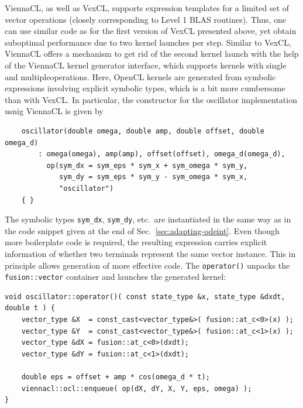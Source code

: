 \documentclass[final]{siamltex}
\newcommand{\code}[1]{\lstinline|#1|}
\begin{document}
ViennaCL, as well as VexCL, supports expression templates for a limited set of    %
vector operations (closely corresponding to Level 1 BLAS routines).
Thus, one can use similar code as for the first version of VexCL presented above,
yet obtain suboptimal performance due to two kernel launches per step.
Similar to VexCL, ViennaCL offers a mechanism to get rid of the second kernel launch
with the help of the ViennaCL kernel generator interface, which supports kernels with single and multipleoperations.
Here, OpenCL kernels are generated from symbolic expressions involving explicit symbolic types,
which is a bit more cumbersome than with VexCL. In particular, the constructor
for the oscillator implementation usnig ViennaCL is given by
%
%
%
\begin{lstlisting}
    oscillator(double omega, double amp, double offset, double omega_d)
        : omega(omega), amp(amp), offset(offset), omega_d(omega_d),
          op(sym_dx = sym_eps * sym_x + sym_omega * sym_y,
             sym_dy = sym_eps * sym_y - sym_omega * sym_x,
             "oscillator")
    { }
\end{lstlisting}
%
The symbolic types \code{sym_dx}, \code{sym_dy}, etc.~are instantiated in the same way
as in the code snippet given at the end of Sec.~\ref{sec:adapting-odeint}.
Even though more boilerplate code is required, the resulting expression
carries explicit information of whether two terminals represent the same vector
instance. This in principle allows generation of more effective code. The
\code{operator()} unpacks the \code{fusion::vector} container and launches
the generated kernel:
\begin{lstlisting}
void oscillator::operator()( const state_type &x, state_type &dxdt, double t ) {
    vector_type &X  = const_cast<vector_type&>( fusion::at_c<0>(x) );
    vector_type &Y  = const_cast<vector_type&>( fusion::at_c<1>(x) );
    vector_type &dX = fusion::at_c<0>(dxdt);
    vector_type &dY = fusion::at_c<1>(dxdt);

    double eps = offset + amp * cos(omega_d * t);
    viennacl::ocl::enqueue( op(dX, dY, X, Y, eps, omega) );
}
\end{lstlisting}
\end{document}
